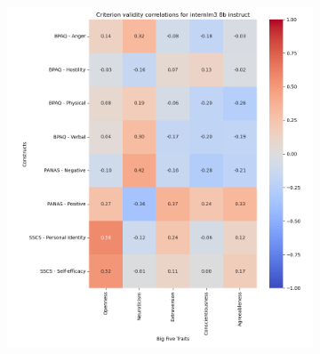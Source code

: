\documentclass{article}
\begin{document}
\begin{figure}[H]
\begin{subfigure}{0.38\textwidth}
    \end{subfigure}
\end{figure}

\begin{figure}[H]
    \centering
    \begin{subfigure}{0.38\textwidth}
        \centering
        \includegraphics[width=\linewidth]{../Prompt_code/plots/internlm3-8b-instruct/crit_val_correlation.png}
    \end{subfigure}
    \begin{subfigure}{0.38\textwidth}
        \centering

\end{subfigure}
\end{figure}
\end{document}
